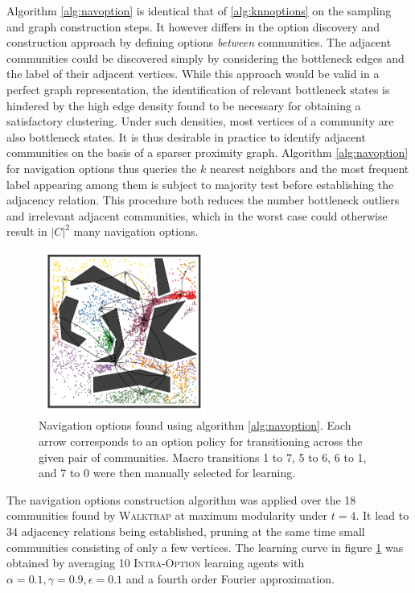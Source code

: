 \documentclass[12pt, oneside, extrafontsizes]{memoir}  %
\theoremstyle{plain}
\theoremstyle{definition}
\begin{document}
Algorithm \ref{alg:navoption} is identical that of \ref{alg:knnoptions} on the sampling and graph construction steps. It however differs in the option discovery and construction approach by defining options \textit{between} communities. The adjacent communities could be discovered simply by considering the bottleneck edges and the label of their adjacent vertices. While this approach would be valid in a perfect graph representation, the identification of relevant bottleneck states is hindered by the high edge density found to be necessary for obtaining a satisfactory clustering. Under such densities, most vertices of a community are also bottleneck states. It is thus desirable in practice to identify adjacent communities on the basis of a sparser proximity graph. Algorithm \ref{alg:navoption} for navigation options thus queries the $k$ nearest neighbors and the most frequent label appearing among them is subject to majority test before establishing the adjacency relation. This procedure both reduces the number bottleneck outliers and irrelevant adjacent communities, which in the worst case could otherwise result in $|C|^2$ many navigation options.

\begin{figure}
\centering
\includegraphics[width=0.49\textwidth]{fig/pinball-nav.pdf}
\caption{Navigation options found using algorithm \ref{alg:navoption}. Each arrow corresponds to an option policy for transitioning across the given pair of communities. Macro transitions 1 to 7, 5 to 6, 6 to 1, and 7 to 0 were then manually selected for learning.}
\label{fig:nav-options}
\end{figure}

The navigation options construction algorithm was applied over the 18 communities found by \textsc{Walktrap} at maximum modularity under $t=4$. It lead to 34 adjacency relations being established, pruning at the same time small communities consisting of only a few vertices. The learning curve in figure \ref{fig:nav-options} was obtained by averaging 10 \textsc{Intra-Option} learning agents with $\alpha = 0.1, \gamma = 0.9, \epsilon = 0.1$ and a fourth order Fourier approximation. 
\end{document}
